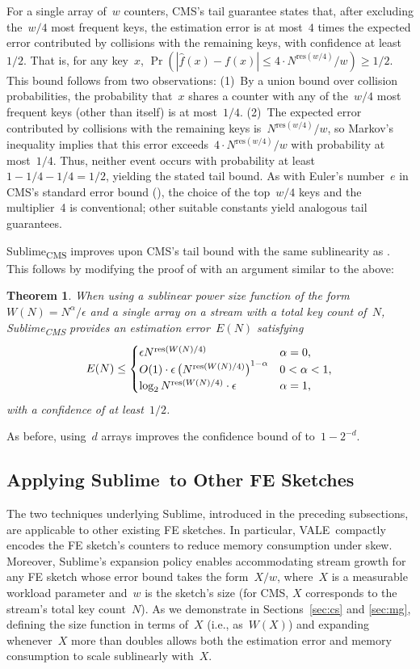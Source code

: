 \documentclass[sigconf]{acmart}
\newtheorem{theorem}{Theorem}[section]
\newcommand{\sketch}{Sublime}
\newcommand{\sketchcms}{\sketch\textsubscript{CMS}\xspace}
\newcommand{\counterencodingabbrv}{VALE}
\begin{document}
For a single array of~$w$ counters, CMS's tail guarantee states that, after excluding the~$w/4$ most frequent keys, the estimation error is at most~$4$ times the expected error contributed by collisions with the remaining keys, with confidence at least~$1/2$.
That is, for any key~$x$, $\Pr(|\hat{f}(x)-f(x)| \leq 4 \cdot N^{\mathrm{res}(w/4)}/w) \geq 1/2$.
This bound follows from two observations:
(1)~By a union bound over collision probabilities, the probability that~$x$ shares a counter with any of the~$w/4$ most frequent keys (other than itself) is at most~$1/4$.
(2)~The expected error contributed by collisions with the remaining keys is~$N^{\mathrm{res}(w/4)}/w$, so Markov's inequality implies that this error exceeds~$4 \cdot N^{\mathrm{res}(w/4)}/w$ with probability at most~$1/4$.
Thus, neither event occurs with probability at least~$1-1/4-1/4=1/2$, yielding the stated tail bound.
As with Euler's number~$e$ in CMS's standard error bound (), the choice of the top~$w/4$ keys and the multiplier~4 is conventional; other suitable constants yield analogous tail guarantees.

\sketchcms improves upon CMS's tail bound with the same sublinearity as .
This follows by modifying the proof of  with an argument similar to the above:
\begin{theorem}
    \label{thm:cms-w-tail}
    When using a sublinear power size function of the form~$W(N)=N^\alpha/\epsilon$ and a single array on a stream with a total key count of~$N$, \sketchcms provides an estimation error~$E(N)$ satisfying 
	$$
    E(N) \leq  
    \begin{cases}
        \epsilon N^{\textup{res}(W(N)/4)} & \text{$\alpha=0$,} \\
        O(1) \cdot \epsilon \left( N^{\textup{res}(W(N)/4)} \right)^{1-\alpha} & \text{$0<\alpha<1$,} \\
        \log_2 N^{\textup{res}(W(N)/4)} \cdot \epsilon & \text{$\alpha=1$,}
	\end{cases}
    $$
    with a confidence of at least~$1/2$.
\end{theorem}
As before, using~$d$ arrays improves the confidence bound of  to~$1-2^{-d}$.

\subsection{Applying \sketch\ to Other FE Sketches}\label{sec:any_sketch}
The two techniques underlying \sketch, introduced in the preceding subsections, are applicable to other existing FE sketches.
In particular, \counterencodingabbrv\ compactly encodes the FE sketch's counters to reduce memory consumption under skew.
Moreover, \sketch's expansion policy enables accommodating stream growth for any FE sketch whose error bound takes the form~$X/w$, where~$X$ is a measurable workload parameter and~$w$ is the sketch's size (for CMS, $X$ corresponds to the stream's total key count~$N$).
As we demonstrate in Sections~\ref{sec:cs} and \ref{sec:mg}, defining the size function in terms of~$X$ (i.e., as~$W(X)$) and expanding whenever~$X$ more than doubles allows both the estimation error and memory consumption to scale sublinearly with~$X$.
\end{document}
